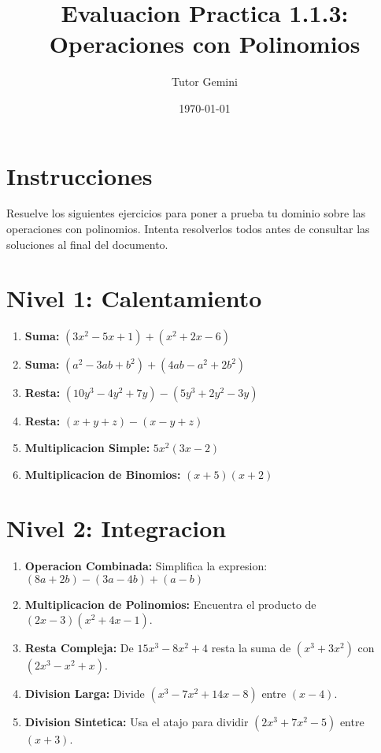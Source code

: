 \documentclass[12pt,a4paper]{article}
\title{\textbf{\Large Evaluacion Practica 1.1.3: Operaciones con Polinomios}}
\author{Tutor Gemini}
\date{\today}
\begin{document}
\maketitle

\section*{Instrucciones}
Resuelve los siguientes ejercicios para poner a prueba tu dominio sobre las operaciones con polinomios. Intenta resolverlos todos antes de consultar las soluciones al final del documento.

\section*{Nivel 1: Calentamiento}
\begin{enumerate}
    \item \textbf{Suma:} $(3x^2 - 5x + 1) + (x^2 + 2x - 6)$
    \item \textbf{Suma:} $(a^2 - 3ab + b^2) + (4ab - a^2 + 2b^2)$
    \item \textbf{Resta:} $(10y^3 - 4y^2 + 7y) - (5y^3 + 2y^2 - 3y)$
    \item \textbf{Resta:} $(x+y+z) - (x-y+z)$
    \item \textbf{Multiplicacion Simple:} $5x^2(3x - 2)$
    \item \textbf{Multiplicacion de Binomios:} $(x+5)(x+2)$
\end{enumerate}

\section*{Nivel 2: Integracion}
\begin{enumerate}
    \item \textbf{Operacion Combinada:} Simplifica la expresion:
    $(8a + 2b) - (3a - 4b) + (a - b)$
    \item \textbf{Multiplicacion de Polinomios:} Encuentra el producto de $(2x - 3)(x^2 + 4x - 1)$.
    \item \textbf{Resta Compleja:} De $15x^3 - 8x^2 + 4$ resta la suma de $(x^3 + 3x^2)$ con $(2x^3 - x^2 + x)$.
    \item \textbf{Division Larga:} Divide $(x^3 - 7x^2 + 14x - 8)$ entre $(x - 4)$.
    \item \textbf{Division Sintetica:} Usa el atajo para dividir $(2x^3 + 7x^2 - 5)$ entre $(x + 3)$.
\end{enumerate}
\end{document}

